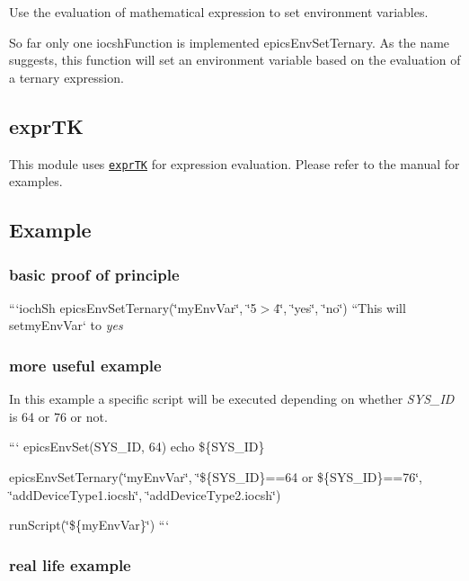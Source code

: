 Use the evaluation of mathematical expression to set environment variables.

So far only one iocsh\-Function is implemented {\ttfamily epics\-Env\-Set\-Ternary}. As the name suggests, this function will set an environment variable based on the evaluation of a ternary expression.

\subsection*{expr\-T\-K}

This module uses \href{https://github.com/ArashPartow/exprtk}{\tt expr\-T\-K} for expression evaluation. Please refer to the manual for examples.

\subsection*{Example}

\subsubsection*{basic proof of principle}

```ioch\-Sh epics\-Env\-Set\-Ternary(\char`\"{}my\-Env\-Var\char`\"{}, \char`\"{}5$>$4\char`\"{}, \char`\"{}yes\char`\"{}, \char`\"{}no\char`\"{}) ``{\ttfamily  This will set}my\-Env\-Var` to {\itshape yes}

\subsubsection*{more useful example}

In this example a specific script will be executed depending on whether {\itshape S\-Y\-S\-\_\-\-I\-D} is 64 or 76 or not.

``` epics\-Env\-Set(\-S\-Y\-S\-\_\-\-I\-D, 64) echo \$\{S\-Y\-S\-\_\-\-I\-D\}

epics\-Env\-Set\-Ternary(\char`\"{}my\-Env\-Var\char`\"{}, \char`\"{}\$\{\-S\-Y\-S\-\_\-\-I\-D\}==64 or \$\{\-S\-Y\-S\-\_\-\-I\-D\}==76\char`\"{}, \char`\"{}add\-Device\-Type1.\-iocsh\char`\"{}, \char`\"{}add\-Device\-Type2.\-iocsh\char`\"{})

run\-Script(\char`\"{}\$\{my\-Env\-Var\}\char`\"{}) ```

\subsubsection*{real life example}

